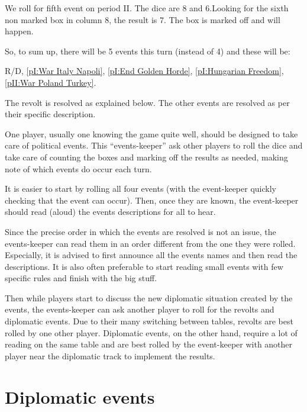 \begin{exemple}
  We roll for fifth event on period II. The dice are 8 and 6.Looking for
  the sixth non marked box in column 8, the result is 7. The box is
  marked off and  will happen.

  So, to sum up, there will be 5 events this turn (instead of 4) and
  these will be:\par
  R/D, \ref{pI:War Italy Napoli}, \ref{pI:End Golden Horde},
  \ref{pI:Hungarian Freedom}, \ref{pII:War Poland Turkey}.

  The revolt is resolved as explained below. The other events are
  resolved as per their specific description.
\end{exemple}

\begin{playtip}
  One player, usually one knowing the game quite well, should be
  designed to take care of political events. This ``events-keeper'' ask
  other players to roll the dice and take care of counting the boxes and
  marking off the results as needed, making note of which events do
  occur each turn.

  It is easier to start by rolling all four events (with the
  event-keeper quickly checking that the event can occur). Then, once
  they are known, the event-keeper should read (aloud) the events
  descriptions for all to hear.

  Since the precise order in which the events are resolved is not an
  issue, the events-keeper can read them in an order different from the
  one they were rolled. Especially, it is advised to first announce all
  the events names and then read the descriptions. It is also often
  preferable to start reading small events with few specific rules and
  finish with the big stuff.

  Then while players start to discuss the new diplomatic situation
  created by the events, the events-keeper can ask another player to
  roll for the revolts and diplomatic events. Due to their many
  switching between tables, revolts are best rolled by one other
  player. Diplomatic events, on the other hand, require a lot of reading
  on the same table and are best rolled by the event-keeper with another
  player near the diplomatic track to implement the results.
\end{playtip}




\section{Diplomatic events}\label{chEvents:diplomacy}


